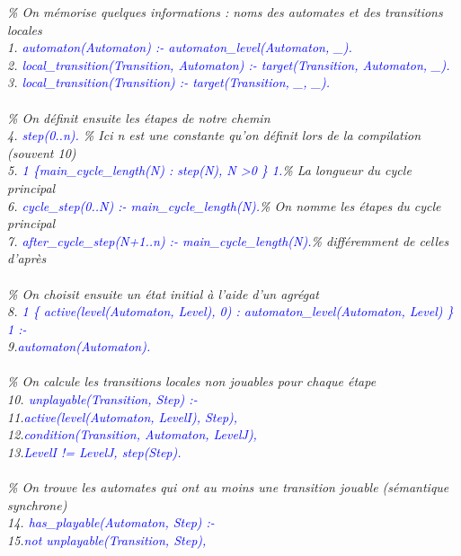 \documentclass[12pt,a4paper]{article}
\begin{document}
\emph{
	\% On mémorise quelques informations : noms des automates et des transitions locales\\
	1. \textcolor{blue}{automaton(Automaton) :- automaton\_level(Automaton, \_).}\\
	2. \textcolor{blue}{local\_transition(Transition, Automaton) :- target(Transition, Automaton, \_).}\\
	3. \textcolor{blue}{local\_transition(Transition) :- target(Transition, \_, \_).}\\ \\
	\% On définit ensuite les étapes de notre chemin\\
	4. \textcolor{blue}{step(0..n).} \% Ici n est une constante qu'on définit lors de la compilation (souvent 10)\\
	5. \textcolor{blue}{1 \{main\_cycle\_length(N) : step(N), N \textgreater 0 \} 1.}\% La longueur du cycle principal\\
	6. \textcolor{blue}{cycle\_step(0..N) :- main\_cycle\_length(N).}\% On nomme les étapes du cycle principal\\
	7. \textcolor{blue}{after\_cycle\_step(N+1..n) :- main\_cycle\_length(N).}\% différemment de celles d'après\\ \\
	\% On choisit ensuite un état initial à l'aide d'un agrégat\\
	8. \textcolor{blue}{1 \{ active(level(Automaton, Level), 0) : automaton\_level(Automaton, Level) \} 1 :-}\\
	9.\qquad\qquad\textcolor{blue}{automaton(Automaton).}\\ \\
	\% On calcule les transitions locales non jouables pour chaque étape\\
	10. \textcolor{blue}{unplayable(Transition, Step) :-}\\
	11.\qquad\qquad\textcolor{blue}{active(level(Automaton, LevelI), Step),}\\
	12.\qquad\qquad\textcolor{blue}{condition(Transition, Automaton, LevelJ),}\\
	13.\qquad\qquad\textcolor{blue}{LevelI != LevelJ, step(Step).}\\ \\
	\% On trouve les automates qui ont au moins une transition jouable (sémantique synchrone)\\
	14. \textcolor{blue}{has\_playable(Automaton, Step) :-}\\
	15.\qquad\qquad\textcolor{blue}{not unplayable(Transition, Step),}\\
}
\end{document}
